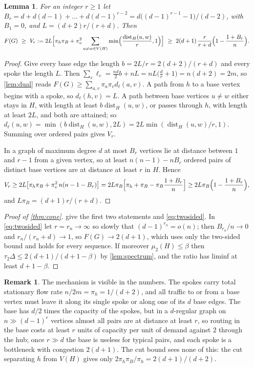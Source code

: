 \documentclass[11pt]{amsart}
\newtheorem{lemma}[theorem]{Lemma}
\theoremstyle{definition}
\newtheorem{remark}[theorem]{Remark}
\DeclareMathOperator{\dist}{dist}
\begin{document}
\begin{lemma}\label{lem:cert}
For an integer $r\ge1$ let $B_r=d+d(d-1)+\dots+d(d-1)^{r-2}=d\bigl((d-1)^{r-1}-1\bigr)/(d-2)$, with $B_1=0$, and $L=(d+2)r/(r+d)$. Then
\begin{equation}\label{eq:Vr}
F(G)\ \ge\ V_r:=2L\Bigl[\pi_h\pi_B+\pi_v^2\sum_{u\ne w\in V(H)}\min\Bigl(\frac{\dist_H(u,w)}r,1\Bigr)\Bigr]
\ \ge\ 2(d+1)\,\frac r{r+d}\Bigl(1-\frac{1+B_r}n\Bigr).
\end{equation}
\end{lemma}

\begin{proof}
Give every base edge the length $b=2L/r=2(d+2)/(r+d)$ and every spoke the length $L$. Then $\sum_e\ell_e=\frac{nd}2b+nL=nL\bigl(\frac dr+1\bigr)=n(d+2)=2m$, so \cref{lem:dual} reads $F(G)\ge\sum_{a,v}\pi_a\pi_vd_\ell(a,v)$. A path from $h$ to a base vertex begins with a spoke, so $d_\ell(h,v)=L$. A path between base vertices $u\ne w$ either stays in $H$, with length at least $b\dist_H(u,w)$, or passes through $h$, with length at least $2L$, and both are attained; so $d_\ell(u,w)=\min(b\dist_H(u,w),2L)=2L\min(\dist_H(u,w)/r,1)$. Summing over ordered pairs gives $V_r$.

In a graph of maximum degree $d$ at most $B_r$ vertices lie at distance between $1$ and $r-1$ from a given vertex, so at least $n(n-1)-nB_r$ ordered pairs of distinct base vertices are at distance at least $r$ in $H$. Hence
\[
V_r\ge2L\bigl[\pi_h\pi_B+\pi_v^2\,n(n-1-B_r)\bigr]=2L\pi_B\Bigl[\pi_h+\pi_B-\pi_B\frac{1+B_r}n\Bigr]\ge2L\pi_B\Bigl(1-\frac{1+B_r}n\Bigr),
\]
and $L\pi_B=(d+1)r/(r+d)$.
\end{proof}

\begin{proof}[Proof of \cref{thm:cone}]
 give the first two statements and \eqref{eq:twosided}. In \eqref{eq:twosided} let $r=r_n\to\infty$ so slowly that $(d-1)^{r_n}=o(n)$; then $B_{r_n}/n\to0$ and $r_n/(r_n+d)\to1$, so $F(G)\to2(d+1)$, which uses only the two-sided bound and holds for every sequence. If moreover $\mu_2(H)\le\beta$ then $\tau_2\Delta\le2(d+1)/(d+1-\beta)$ by \cref{lem:spectrum}, and the ratio has liminf at least $d+1-\beta$.
\end{proof}

\begin{remark}
The mechanism is visible in the numbers. The spokes carry total stationary flow rate $n/2m=\pi_h=1/(d+2)$, and all traffic to or from a base vertex must leave it along its single spoke or along one of its $d$ base edges. The base has $d/2$ times the capacity of the spokes, but in a $d$-regular graph on $n\gg(d-1)^r$ vertices almost all pairs are at distance at least $r$, so routing in the base costs at least $r$ units of capacity per unit of demand against $2$ through the hub; once $r\gg d$ the base is useless for typical pairs, and each spoke is a bottleneck with congestion $2(d+1)$. The cut bound sees none of this: the cut separating $h$ from $V(H)$ gives only $2\pi_h\pi_B/\pi_h=2(d+1)/(d+2)$.
\end{remark}
\end{document}
